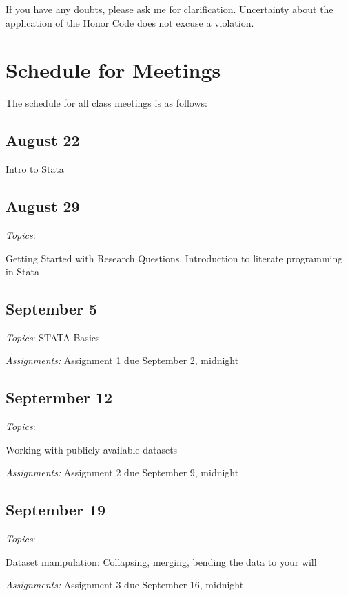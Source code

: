 \documentclass[12pt]{article}
\begin{document}
If you have any doubts, please ask me for clarification. Uncertainty
about the application of the Honor Code does not excuse a violation.

\section{Schedule for Meetings}

The schedule for all class meetings is as follows:

\begin{flushleft}


\subsection{August 22}

Intro to Stata

\subsection{August 29}

\textit{Topics}:

Getting Started with Research Questions, Introduction to literate
programming in Stata

\subsection{September 5}

\textit{Topics}:
STATA Basics

\textit {Assignments:}
Assignment 1 due September 2, midnight

\subsection{Septermber 12}

\textit{Topics}:

Working with publicly available datasets

\textit {Assignments:}
Assignment 2 due September 9, midnight

\subsection{September 19}


\textit{Topics}:

Dataset manipulation: Collapsing, merging, bending the data to your will


\textit {Assignments:}
Assignment 3 due September 16, midnight

\end{flushleft}
\end{document}
